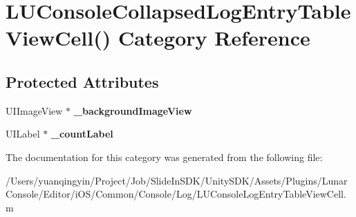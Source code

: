 \hypertarget{category_l_u_console_collapsed_log_entry_table_view_cell_07_08}{}\section{L\+U\+Console\+Collapsed\+Log\+Entry\+Table\+View\+Cell() Category Reference}
\label{category_l_u_console_collapsed_log_entry_table_view_cell_07_08}
\subsection*{Protected Attributes}
\begin{DoxyCompactItemize}
\item 
\mbox{\label{category_l_u_console_collapsed_log_entry_table_view_cell_07_08_a425baf5ea2fa0a5dd3036d68ca6d377b}} 
U\+I\+Image\+View $\ast$ {\bfseries \+\_\+background\+Image\+View}
\item 
\mbox{\label{category_l_u_console_collapsed_log_entry_table_view_cell_07_08_a0ef1ee2265e19a67e885b755d03a2aaf}} 
U\+I\+Label $\ast$ {\bfseries \+\_\+count\+Label}
\end{DoxyCompactItemize}


The documentation for this category was generated from the following file\+:\begin{DoxyCompactItemize}
\item 
/\+Users/yuanqingyin/\+Project/\+Job/\+Slide\+In\+S\+D\+K/\+Unity\+S\+D\+K/\+Assets/\+Plugins/\+Lunar\+Console/\+Editor/i\+O\+S/\+Common/\+Console/\+Log/L\+U\+Console\+Log\+Entry\+Table\+View\+Cell.\+m\end{DoxyCompactItemize}
